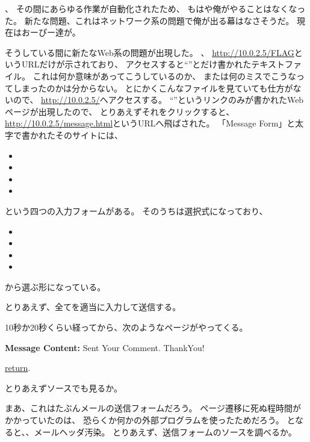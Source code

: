 、
その間にあらゆる作業が自動化されたため、
もはや俺がやることはなくなった。
新たな問題、これはネットワーク系の問題で俺が出る幕はなさそうだ。
現在はおーぴー達が。

そうしている間に新たなWeb系の問題が出現した。
、
\url{http://10.0.2.5/FLAG}というURLだけが示されており、
アクセスすると``''とだけ書かれたテキストファイル。
これは何か意味があってこうしているのか、
または何のミスでこうなってしまったのかは分からない。
とにかくこんなファイルを見ていても仕方がないので、
\url{http://10.0.2.5/}へアクセスする。
``''というリンクのみが書かれたWebページが出現したので、
とりあえずそれをクリックすると、\url{http://10.0.2.5/message.html}というURLへ飛ばされた。
「Message Form」と太字で書かれたそのサイトには、

\begin{itemize}
	\item {}
	\item {}
	\item {}
	\item {}
\end{itemize}

という四つの入力フォームがある。
そのうちは選択式になっており、

\begin{itemize}
	\item {}
	\item {}
	\item {}
	\item {}
\end{itemize}

から選ぶ形になっている。

とりあえず、全てを適当に入力して送信する。

10秒か20秒くらい経ってから、次のようなページがやってくる。

\begin{itembox}[c]{\textbf{Message Content:}}
Sent Your Comment. ThankYou!

\underline{return}. 
\end{itembox}

とりあえずソースでも見るか。



まあ、これはたぶんメールの送信フォームだろう。
ページ遷移に死ぬ程時間がかかっていたのは、
恐らくか何かの外部プログラムを使ったためだろう。
となると、、メールヘッダ汚染。
とりあえず、送信フォームのソースを調べるか。

